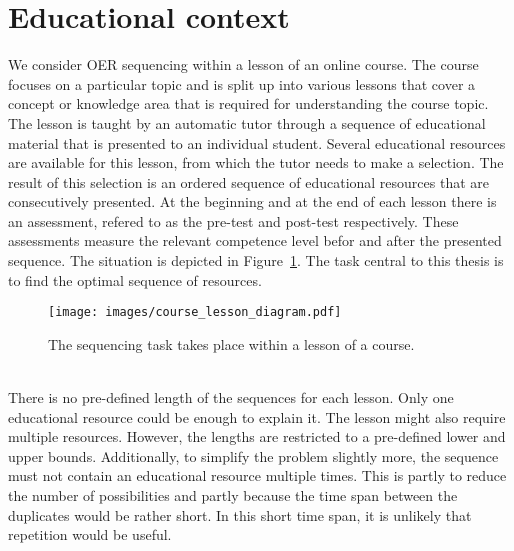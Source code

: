 \section{Educational context}
\label{sec:task_context}
We consider OER sequencing within a lesson of an online course. The course
focuses on a particular topic and is split up into various lessons that cover a
concept or knowledge area that is required for understanding the
course topic. The lesson is taught by an automatic tutor through a sequence of
educational material that is presented to an individual student. Several
educational resources are available for this lesson, from which the tutor needs
to make a selection. The result of this selection is an ordered sequence of
educational resources that are consecutively presented. At the beginning and at
the end of each lesson there is an assessment, refered to as the pre-test and
post-test respectively. These assessments measure the relevant competence level
befor and after the presented sequence. The situation is depicted in
Figure~\ref{fig:course_lesson_diagram}. The task central to this thesis is to
find the optimal sequence of resources.\\
\begin{figure}[ht]
	\centering
	\texttt{[image: images/course\_lesson\_diagram.pdf]}
	\caption[Educational context of the task]{The sequencing task takes place
	within a lesson of a course.}
	\label{fig:course_lesson_diagram}
\end{figure}\\
\noindent
There is no pre-defined length of the sequences for each lesson. Only one
educational resource could be enough to explain it. The lesson might also
require multiple resources. However, the lengths are restricted to a
pre-defined lower and upper bounds. Additionally, to simplify the problem
slightly more, the sequence must not contain an educational resource multiple
times. This is partly to reduce the number of possibilities and partly because
the time span between the duplicates would be rather short. In this short time
span, it is unlikely that repetition would be useful.
